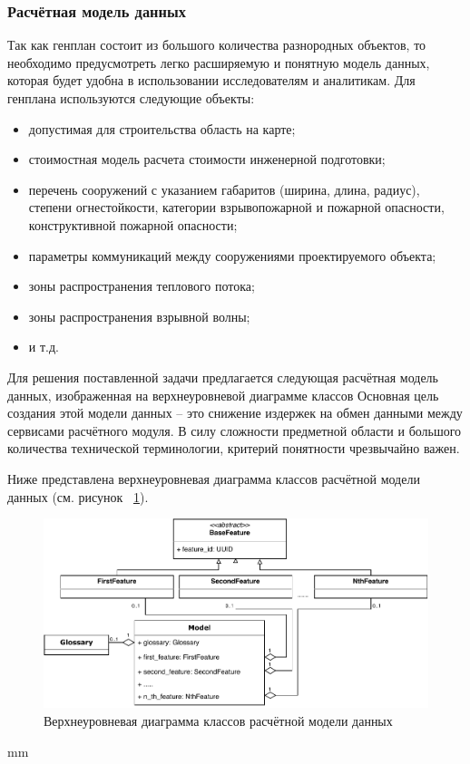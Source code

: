 \subsubsection{{Расчётная модель данных}}

Так как генплан состоит из большого количества разнородных объектов,
то необходимо предусмотреть легко расширяемую и понятную модель данных,
которая будет удобна в использовании исследователям и аналитикам.
Для генплана используются следующие объекты:
\begin{itemize}
    \item допустимая для строительства область на карте;
    \item стоимостная модель расчета стоимости инженерной подготовки;
    \item перечень сооружений с указанием габаритов (ширина, длина, радиус),
    степени огнестойкости, категории взрывопожарной и пожарной опасности, конструктивной пожарной опасности;
    \item параметры коммуникаций между сооружениями проектируемого объекта;
    \item зоны распространения теплового потока;
    \item зоны распространения взрывной волны;
	\item и т.д.
\end{itemize}

Для решения поставленной задачи предлагается следующая расчётная модель данных, изображенная
на верхнеуровневой диаграмме классов
Основная цель создания этой модели данных -- это снижение издержек на обмен данными между
сервисами расчётного модуля.
В силу сложности предметной области и большого количества технической терминологии,
критерий понятности чрезвычайно важен.

Ниже представлена верхнеуровневая диаграмма классов расчётной модели данных
(см. рисунок \ \ref{pic:architecture__model-classes}).

\begin{figure}[H]
	\includegraphics[width=\textwidth, left]{architecture/pictures/model/classes}
	\caption{Верхнеуровневая диаграмма классов расчётной модели данных}
	\label{pic:architecture__model-classes}
\end{figure}
 mm

